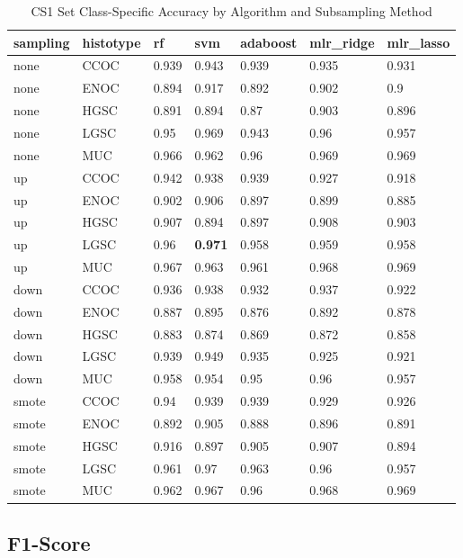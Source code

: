 \documentclass[
]{report}
\begin{document}
\begin{table}

\caption{\label{tab:cs1-accuracy-class-table}CS1 Set Class-Specific Accuracy by Algorithm and Subsampling Method}
\centering
\begin{tabular}[t]{l|l|l|l|l|l|l}
\hline
sampling & histotype & rf & svm & adaboost & mlr\_ridge & mlr\_lasso\\
\hline
none & CCOC & 0.939 & 0.943 & 0.939 & 0.935 & 0.931\\
\hline
none & ENOC & 0.894 & 0.917 & 0.892 & 0.902 & 0.9\\
\hline
none & HGSC & 0.891 & 0.894 & 0.87 & 0.903 & 0.896\\
\hline
none & LGSC & 0.95 & 0.969 & 0.943 & 0.96 & 0.957\\
\hline
none & MUC & 0.966 & 0.962 & 0.96 & 0.969 & 0.969\\
\hline
up & CCOC & 0.942 & 0.938 & 0.939 & 0.927 & 0.918\\
\hline
up & ENOC & 0.902 & 0.906 & 0.897 & 0.899 & 0.885\\
\hline
up & HGSC & 0.907 & 0.894 & 0.897 & 0.908 & 0.903\\
\hline
up & LGSC & 0.96 & \textbf{0.971} & 0.958 & 0.959 & 0.958\\
\hline
up & MUC & 0.967 & 0.963 & 0.961 & 0.968 & 0.969\\
\hline
down & CCOC & 0.936 & 0.938 & 0.932 & 0.937 & 0.922\\
\hline
down & ENOC & 0.887 & 0.895 & 0.876 & 0.892 & 0.878\\
\hline
down & HGSC & 0.883 & 0.874 & 0.869 & 0.872 & 0.858\\
\hline
down & LGSC & 0.939 & 0.949 & 0.935 & 0.925 & 0.921\\
\hline
down & MUC & 0.958 & 0.954 & 0.95 & 0.96 & 0.957\\
\hline
smote & CCOC & 0.94 & 0.939 & 0.939 & 0.929 & 0.926\\
\hline
smote & ENOC & 0.892 & 0.905 & 0.888 & 0.896 & 0.891\\
\hline
smote & HGSC & 0.916 & 0.897 & 0.905 & 0.907 & 0.894\\
\hline
smote & LGSC & 0.961 & 0.97 & 0.963 & 0.96 & 0.957\\
\hline
smote & MUC & 0.962 & 0.967 & 0.96 & 0.968 & 0.969\\
\hline
\end{tabular}
\end{table}

\hypertarget{f1-score-1}{%
\subsection{F1-Score}\label{f1-score-1}}
\end{document}
